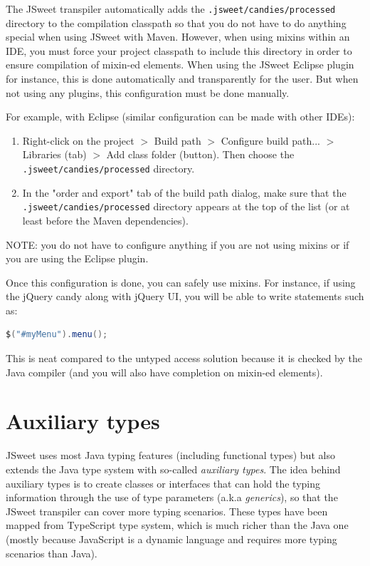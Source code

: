 \documentclass[a4paper]{report}
\begin{document}
The JSweet transpiler automatically adds the \texttt{.jsweet/candies/processed} directory to the compilation classpath so that you do not have to do anything special when using JSweet with Maven. However, when using mixins within an IDE, you must force your project classpath to include this directory in order to ensure compilation of mixin-ed elements. When using the JSweet Eclipse plugin for instance, this is done automatically and transparently for the user. But when not using any plugins, this configuration must be done manually.

For example, with Eclipse (similar configuration can be made with other IDEs):

\begin{enumerate}
\item Right-click on the project $>$ Build path $>$ Configure build path... $>$ Libraries (tab) $>$ Add class folder (button). Then choose the \texttt{.jsweet/candies/processed} directory.
\item In the "order and export" tab of the build path dialog, make sure that the \texttt{.jsweet/candies/processed} directory appears at the top of the list (or at least before the Maven dependencies).
\end{enumerate}

NOTE: you do not have to configure anything if you are not using mixins or if you are using the Eclipse plugin.

Once this configuration is done, you can safely use mixins. For instance, if using the jQuery candy along with jQuery UI, you will be able to write statements such as:

\begin{lstlisting}[language=Java]
$("#myMenu").menu();
\end{lstlisting}

This is neat compared to the untyped access solution because it is checked by the Java compiler (and you will also have completion on mixin-ed elements).

\chapter{Auxiliary types}

JSweet uses most Java typing features (including functional types) but also extends the Java type system with so-called \emph{auxiliary types}. The idea behind auxiliary types is to create classes or interfaces that can hold the typing information through the use of type parameters (a.k.a \emph{generics}), so that the JSweet transpiler can cover more typing scenarios. These types have been mapped from TypeScript type system, which is much richer than the Java one (mostly because JavaScript is a dynamic language and requires more typing scenarios than Java). 
\end{document}
